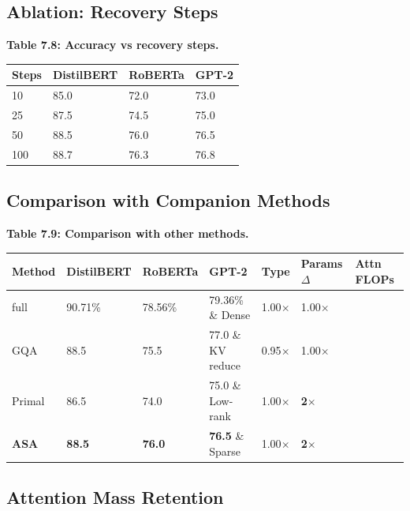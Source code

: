 \subsection{Ablation: Recovery Steps}

\textbf{Table 7.8: Accuracy vs recovery steps.}

\begin{table}[H]
\centering
\small
\begin{tabular}{llll}
\toprule
\textbf{Steps} & \textbf{DistilBERT} & \textbf{RoBERTa} & \textbf{GPT-2} \\
\midrule
10 & 85.0 & 72.0 & 73.0 \\
25 & 87.5 & 74.5 & 75.0 \\
50 & 88.5 & 76.0 & 76.5 \\
100 & 88.7 & 76.3 & 76.8 \\
\bottomrule
\end{tabular}
\end{table}

\subsection{Comparison with Companion Methods}

\textbf{Table 7.9: Comparison with other methods.}

\begin{table}[H]
\centering
\small
\begin{tabular}{lllllll}
\toprule
\textbf{Method} & \textbf{DistilBERT} & \textbf{RoBERTa} & \textbf{GPT-2} & \textbf{Type} & \textbf{Params $\Delta$} & \textbf{Attn FLOPs} \\
\midrule
full & 90.71\% & 78.56\% & 79.36\% \& Dense & 1.00$\times$ & 1.00$\times$ \\
GQA & 88.5 & 75.5 & 77.0 \& KV reduce & 0.95$\times$ & 1.00$\times$ \\
Primal & 86.5 & 74.0 & 75.0 \& Low-rank & 1.00$\times$ & \textbf{2$\times$} \\
\textbf{ASA} & \textbf{88.5} & \textbf{76.0} & \textbf{76.5} \& Sparse & 1.00$\times$ & \textbf{2$\times$} \\
\bottomrule
\end{tabular}
\end{table}

\subsection{Attention Mass Retention}

